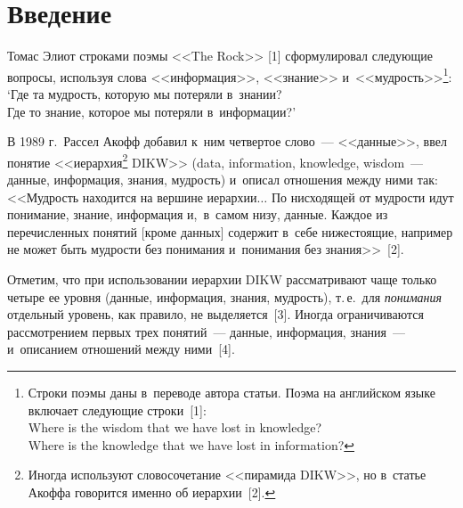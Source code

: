 
  
\vspace*{12pt}



\thispagestyle{headings}

\begin{multicols}{2}

\label{st\stat}

\section{Введение}



Томас Элиот строками поэмы <<The Rock>> [1] сформулировал следующие 
вопросы, используя слова <<информация>>, <<знание>> и~<<мудрость>>\footnote[2]{Строки поэмы даны в~переводе автора статьи. Поэма на английском языке 
включает следующие строки~[1]:\\
Where is the wisdom that we have lost in knowledge?\\
   Where is the knowledge that we have lost in information?}:\\
  `Где та мудрость, которую мы потеряли в~знании?\\
  Где то знание, которое мы потеряли в~информации?'
  
  В 1989 г.~Рассел Акофф добавил к~ним чет\-вер\-тое слово~--- <<данные>>, 
ввел понятие <<иерархия\footnote[3]{Иногда используют словосочетание <<пирамида 
DIKW>>, но в~статье Акоффа говорится именно об иерархии~[2].} DIKW>> (data, information, 
knowledge, wisdom~--- данные, информация, знания, мудрость) и~описал 
отношения между ними так: <<Мудрость находится на вершине 
иерархии$\ldots$ По нисходящей от мудрости идут понимание, знание, 
информация и,~в~самом низу, данные. Каждое из перечисленных понятий 
[кроме данных] содержит в~себе нижестоящие, например не может быть 
мудрости без понимания и~понимания без знания>>~[2].
  
  Отметим, что при использовании иерархии DIKW рассматривают чаще 
только четыре ее уровня (данные, информация, знания, мудрость), т.\,е.\ для 
\textit{понимания} отдельный уровень, как правило, не выделяется~[3]. Иногда 
ограничиваются рас\-смот\-ре\-ни\-ем первых трех понятий~--- данные, информация, 
знания~--- и~описанием отношений между ними~[4].
{

}
\end{multicols}

